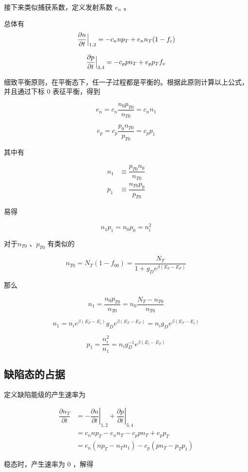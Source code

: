 \documentclass[cn,11pt,chinese,black,simple]{../elegantbook}
\begin{document}
接下来类似捕获系数，定义发射系数 \(e_n\) 。

总体有 
\[
\dfrac{\partial{}n}{\partial{}t}\Big|_{1,2} = - c_n n p_T + e_n n_T (1 - f_c)
\]

\[
\dfrac{\partial{}p}{\partial{}t}\Big|_{3,4} = - c_p p n_T + e_p p_T f_v
\]

细致平衡原则，在平衡态下，任一子过程都是平衡的。根据此原则计算以上公式，并且通过下标 0 表征平衡，得到

\[e_n = c_n \dfrac{n_0 p_{T0}}{n_{T0}} = c_n n_1\]

\[e_p = c_p \dfrac{p_0 n_{T0}}{p_{T0}} = c_p p_1\]

其中有 

\[\begin{aligned}
    n_{1} & \equiv \dfrac{p_{ T 0} n_{0}}{n_{ T 0}} \\
    p_{1} & \equiv \dfrac{n_{ T 0} p_{0}}{p_{ T 0}}
\end{aligned}\]

易得 

\[n_1 p_1 = n_0 p_0 = n_i^2\]

对于\(n_{T0}\) 、\(p_{T0}\) 有类似的

\[n_{T 0}=N_{T}\left(1-f_{00}\right)=\dfrac{N_{T}}{1+g_{D} e^{\beta\left(E_{T}-E_{F}\right)}}\]

那么

\[n_1 = \dfrac{n_0 p_{T0}}{n_{T0}} = n_0 \dfrac{N_T - n_{T0}}{n_{T0}}\]

\[n_1 = n_i e^{\beta (E_F - E_i)} g_D e^{\beta (E_T - E_F)} = n_i g_D e^{\beta (E_T - E_i)}\]

\[p_1 = \dfrac{n_i^2}{n_1} = n_i g_D^{-1} e^{\beta (E_i - E_T)}\]

\subsection{缺陷态的占据}

定义缺陷能级的产生速率为 

\[\begin{aligned}
    \dfrac{\partial n_{T}}{\partial t} &=-\left.\dfrac{\partial n}{\partial t}\right|_{1,2}+\left.\dfrac{\partial p}{\partial t}\right|_{3,4} \\
    &=c_{n} n p_{T}-e_{n} n_{T}-c_{p} p n_{T}+e_{p} p_{T} \\
    &=c_{n}\left(n p_{T}-n_{T} n_{1}\right)-c_{p}\left(p n_{T}-p_{T} p_{1}\right)
\end{aligned}\]

稳态时，产生速率为 0 ，解得
\end{document}
